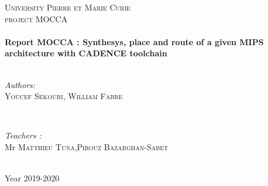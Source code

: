\documentclass[11pt,a4paper,sans,dvipsnames]{report}
\begin{document}
\begin{titlepage}

	\center %


	\textsc{\LARGE University Pierre et Marie Curie}\\[1.5cm] %
	\textsc{\Large project MOCCA}\\[0.5cm] %

	\vfill
	\HRule \\[0.4cm]
	{ \huge \bfseries Report MOCCA : Synthesys, place and route of a given MIPS architecture with CADENCE toolchain}\\[0.4cm] 
	\HRule \\[1.5cm]
	\vfill

	\begin{minipage}{0.4\textwidth}
		\begin{flushleft} \large
			\emph{Authors:}\\
			\textsc{Youcef Sekouri, William Fabre} 
		\end{flushleft}
	\end{minipage}
	~
	\begin{minipage}{0.4\textwidth}
		\begin{flushright} \large
			\emph{Teachers :} \\
			Mr \textsc{Matthieu Tuna},\textsc{Pirouz Bazarghan-Sabet}
		\end{flushright}
	\end{minipage}\\[2cm]


	{\large Year 2019-2020}\\[2cm] %

\end{titlepage}
\end{document}
